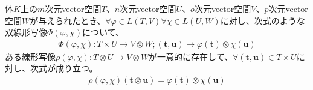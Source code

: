 \documentclass[dvipdfmx]{jsarticle}
\begin{document}
\begin{thm}\label{2.4.5.10}
体$K$上の$m$次元vector空間$T$、$n$次元vector空間$U$、$o$次元vector空間$V$、$p$次元vector空間$W$が与えられたとき、$\forall\varphi \in L(T,V)\forall\chi \in L(U,W)$に対し、次式のような双線形写像$\varPhi(\varphi,\chi)$について、
\begin{align*}
\varPhi(\varphi,\chi):T \times U \rightarrow V \otimes W;\left( \mathbf{t},\mathbf{u} \right) \mapsto \varphi\left( \mathbf{t} \right) \otimes \chi\left( \mathbf{u} \right)
\end{align*}
ある線形写像$\rho(\varphi,\chi):T \otimes U \rightarrow V \otimes W$が一意的に存在して、$\forall\left( \mathbf{t},\mathbf{u} \right) \in T \times U$に対し、次式が成り立つ。
\begin{align*}
\rho(\varphi,\chi)\left( \mathbf{t} \otimes \mathbf{u} \right) = \varphi\left( \mathbf{t} \right) \otimes \chi\left( \mathbf{u} \right)
\end{align*}
\end{thm}
\end{document}
